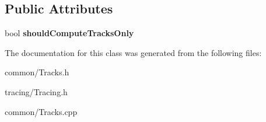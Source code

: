 \subsection*{Public Attributes}
\begin{DoxyCompactItemize}
\item 
\mbox{\label{class_tracks_a66cb4ec9a2db84d0abecb7ea327dffdd}} 
bool {\bfseries should\+Compute\+Tracks\+Only}
\end{DoxyCompactItemize}


The documentation for this class was generated from the following files\+:\begin{DoxyCompactItemize}
\item 
common/Tracks.\+h\item 
tracing/Tracing.\+h\item 
common/Tracks.\+cpp\end{DoxyCompactItemize}
